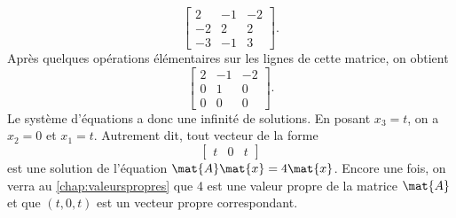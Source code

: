 \begin{exercice}
\begin{sol}
\begin{enumerate}
\begin{displaymath}
\begin{bmatrix}
          2 & -1 & -2 \\ -2 & 2 & 2 \\ -3 & -1 & 3
        \end{bmatrix}.
      \end{displaymath}
      Après quelques opérations élémentaires sur les lignes de cette
      matrice, on obtient
      \begin{displaymath}
        \begin{bmatrix}
          2 & -1 & -2 \\ 0 & 1 & 0 \\ 0 & 0 & 0
        \end{bmatrix}.
      \end{displaymath}
      Le système d'équations a donc une infinité de solutions. En
      posant $x_3 = t$, on a $x_2 = 0$ et $x_1 = t$. Autrement dit,
      tout vecteur de la forme
      \begin{displaymath}
        \begin{bmatrix}
          t & 0 & t
        \end{bmatrix}
      \end{displaymath}
      est une solution de l'équation $\mat{A} \mat{x} = 4 \mat{x}$.
      Encore une fois, on verra au \autoref{chap:valeurspropres}
      que 4 est une valeur propre de la matrice $\mat{A}$ et que $(t,
      0, t)$ est un vecteur propre correspondant.
    \end{enumerate}
  \end{sol}
\end{exercice}

